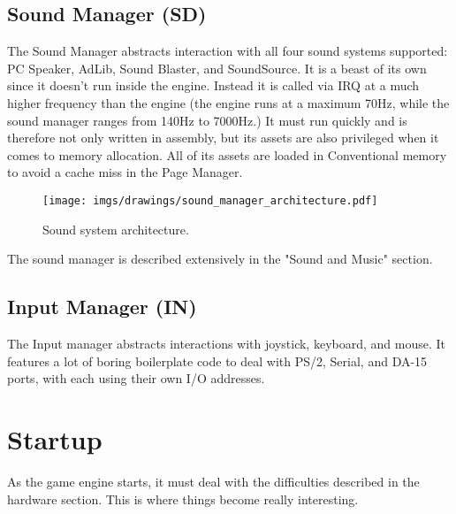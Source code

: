 \documentclass[book.tex]{subfiles}
\begin{document}
\subsection{Sound Manager (SD)}
The Sound Manager abstracts interaction with all four sound systems supported: PC Speaker, AdLib, Sound Blaster, and SoundSource. It is a beast of its own since it doesn't run inside the engine. Instead it is called via IRQ at a much higher frequency than the engine (the engine runs at a maximum 70Hz, while the sound manager ranges from 140Hz to 7000Hz.) It must run quickly and is therefore not only written in assembly, but its assets are also privileged when it comes to memory allocation. All of its assets are loaded in Conventional memory to avoid a cache miss in the Page Manager.\\
 \par
\begin{figure}[H]
\centering
 \texttt{[image: imgs/drawings/sound\_manager\_architecture.pdf]}
 \caption{Sound system architecture.}
 \end{figure}
 \par
The sound manager is described extensively in the "Sound and Music" section.

















\subsection{Input Manager (IN)}
The Input manager abstracts interactions with joystick, keyboard, and mouse. It features a lot of boring boilerplate code to deal with PS/2, Serial, and DA-15 ports, with each using their own I/O addresses.
















\section{Startup}
As the game engine starts, it must deal with the difficulties described in the hardware section. This is where things become really interesting.
\end{document}
